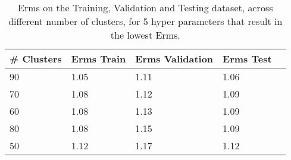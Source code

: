 \def\arraystretch{1.25}
\begin{table}[H]
\centering
\begin{tabular}{l l l l l}
\hline
\hline
\textbf{\# Clusters} & \textbf{Erms Train} & \textbf{Erms Validation} & \textbf{Erms Test}\\
\hline
\hline
90 & 1.05 & 1.11 & 1.06 \\
70 & 1.08 & 1.12 & 1.09 \\
60 & 1.08 & 1.13 & 1.09 \\
80 & 1.08 & 1.15 & 1.09 \\
50 & 1.12 & 1.17 & 1.12 \\
\hline
\end{tabular}
\caption{Erms on the Training, Validation and Testing dataset, across different number of clusters, for 5 hyper parameters that result in the lowest Erms.}
\end{table}

